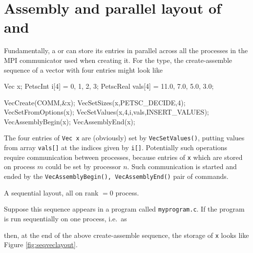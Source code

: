 \section{Assembly and parallel layout of \pVecs and \pMats}

Fundamentally, a \pVec or \pMat can store its entries in parallel across all the processes in the MPI communicator used when creating it.  For the \pVec type, the create-assemble sequence of a vector with four entries might look like
\begin{code}
Vec x;
PetscInt   i[4] = {0, 1, 2, 3};
PetscReal  vals[4] = {11.0, 7.0, 5.0, 3.0};

VecCreate(COMM,&x);
VecSetSizes(x,PETSC_DECIDE,4);
VecSetFromOptions(x);
VecSetValues(x,4,i,vals,INSERT_VALUES);
VecAssemblyBegin(x);
VecAssemblyEnd(x);
\end{code}
The four entries of \texttt{Vec x} are (obviously) set by \texttt{VecSetValues()}, putting values from array \texttt{vals[]} at the indices given by \texttt{i[]}.  Potentially such operations require communication between processes, because entries of \texttt{x} which are stored on process $m$ could be set by processor $n$.  Such communication is started and ended by the \texttt{VecAssemblyBegin(), VecAssemblyEnd()} pair of commands.

\begin{marginfigure}
\bigskip
\caption{A sequential \pVec layout, all on rank $=0$ process.}
\label{fig:seqveclayout}
\end{marginfigure}

Suppose this sequence appears in a program called \texttt{myprogram.c}.  If the program is run sequentially on one process, i.e.~as
then, at the end of the above create-assemble sequence, the storage of \texttt{x} looks like Figure \ref{fig:seqveclayout}.


